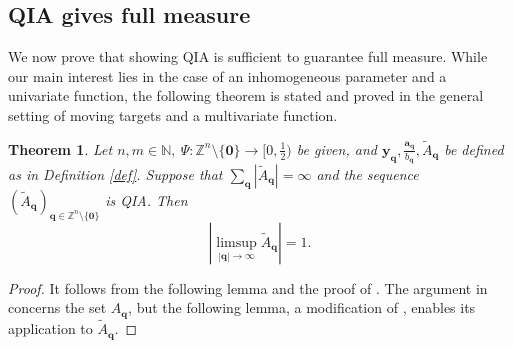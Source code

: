 \documentclass[reqno]{amsart}
\newtheorem{theorem}{Theorem}
\theoremstyle{definition}
\theoremstyle{remark}
\begin{document}
\vspace{.1cm}
\subsection{QIA gives full measure}
We now prove that showing QIA is sufficient to guarantee full measure. While our main interest lies in the case of an inhomogeneous parameter and a univariate function, the following theorem is stated and proved in the general setting of moving targets and a multivariate function.
\begin{theorem}\label{thm4}
    Let $n,m \in \mathbb{N},\ \Psi: \mathbb{Z}^n \setminus\{\mathbf{0}\} \to [0,\frac{1}{2})$ be given, and $\mathbf{y}_\mathbf{q}, \frac{\mathbf{a}_\mathbf{q}}{b_\mathbf{q}}, \tilde{A}_\mathbf{q}$ be defined as in Definition \ref{def}. Suppose that $\sum_\mathbf{q} |\tilde A_\mathbf q| = \infty$ and the sequence $(\tilde A_\mathbf{q})_{\mathbf q \in \mathbb{Z}^n \setminus \{\mathbf 0\}}$ is QIA. Then
    $$\left|\limsup_{|\mathbf q| \to \infty} \tilde A_\mathbf{q} \right| = 1.$$
\end{theorem}
\begin{proof}
    It follows from the following lemma and the proof of \cite[Proposition 1]{AR22}. The argument in \cite[Proposition 1]{AR22} concerns the set $A_\mathbf{q}$, but the following lemma, a modification of \cite[Lemma 7]{AR22}, enables its application to $\tilde{A}_\mathbf{q}$.
\end{proof}
\end{document}
